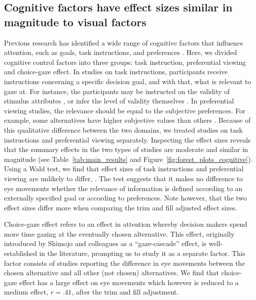 \subsection{Cognitive factors have effect sizes similar in magnitude to visual factors}

Previous research has identified a wide range of cognitive factors that influence attention, such as goals, task instructions, and preferences \citep[for a review see][]{orquin2013a}. Here, we divided cognitive control factors into three groups: task instruction, preferential viewing and choice-gaze effect. In studies on task instructions, participants receive instructions concerning a specific decision goal, and with that, what is relevant to gaze at. For instance, the participants may be instructed on the validity of stimulus attributes \citep{krefeld-schwalb2019a}, or infer the level of validity themselves \citep{bialkova2014a}. In preferential viewing studies, the relevance should be equal to the subjective preferences. For example, some alternatives have higher subjective values than others \citep{kim2012a}. Because of this qualitative difference between the two domains, we treated studies on task instructions and preferential viewing separately. 
Inspecting the effect sizes reveals that the summary effects in the two types of studies are moderate and similar in magnitude (see Table~\ref{tab:main_results} and Figure~\ref{fig:forest_plots_cognitive}). Using a Wald test, we find that effect sizes of task instructions and preferential viewing are unlikely to differ, . 
The test suggests that it makes no difference to eye movements whether the relevance of information is defined according to an externally specified goal or according to preferences. Note however, that the two effect sizes differ more when comparing the trim and fill adjusted effect sizes.

Choice-gaze effect refers to an effect in attention whereby decision makers spend more time gazing at the eventually chosen alternative. This effect, originally introduced by Shimojo and colleagues \citep{shimojo2003a} as a ``gaze-cascade'' effect, is well-established in the literature, prompting us to study it as a separate factor. This factor consists of studies reporting the difference in eye movements between the chosen alternative and all other (not chosen) alternatives. We find that choice-gaze effect has a large effect on eye movements which however is reduced to a medium effect, $r=.41$, after the trim and fill adjustment.


